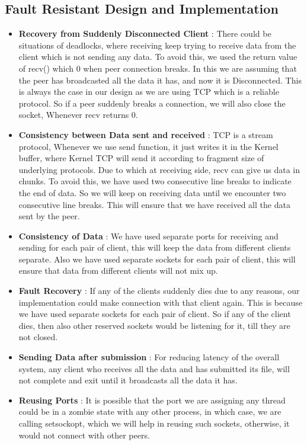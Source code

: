 \documentclass[12pt]{scrartcl}
\begin{document}
\subsection{Fault Resistant Design and Implementation}
\begin{itemize}
    \item \textbf{Recovery from Suddenly Disconnected Client} : There could be situations of deadlocks, where receiving keep trying to receive data from the client which is not sending any data. To avoid this, we used the return value of recv() which 0 when peer connection breaks. In this we are assuming that the peer has broadcasted all the data it has, and now it is Disconnected. This is always the case in our design as we are using TCP which is a reliable protocol. So if a peer suddenly breaks a connection, we will also close the socket, Whenever recv returns 0.
    \item \textbf{Consistency between Data sent and received} : TCP is a stream protocol, Whenever we use send function, it just writes it in the Kernel buffer, where Kernel TCP will send it according to fragment size of underlying protocols. Due to which at receiving side, recv can give us data in chunks. To avoid this, we have used two consecutive line breaks to indicate the end of data. So we will keep on receiving data until we encounter two consecutive line breaks. This will ensure that we have received all the data sent by the peer.
    \item \textbf{Consistency of Data} : We have used separate ports for receiving and sending for each pair of client, this will keep the data from different clients separate. Also we have used separate sockets for each pair of client, this will ensure that data from different clients will not mix up.
    \item \textbf{Fault Recovery} : If any of the clients suddenly dies due to any reasons, our implementation could make connection with that client again. This is because we have used separate sockets for each pair of client. So if any of the client dies, then also other reserved sockets would be listening for it, till they are not closed.
    \item \textbf{Sending Data after submission} : For reducing latency of the overall system, any client who receives all the data and has submitted its file, will not complete and exit until it broadcasts all the data it has.
    \item \textbf{Reusing Ports} : It is possible that the port we are assigning any thread could be in a zombie state with any other process, in which case, we are calling setsockopt, which we will help in reusing such sockets, otherwise, it would not connect with other peers.
\end{itemize}
\end{document}
